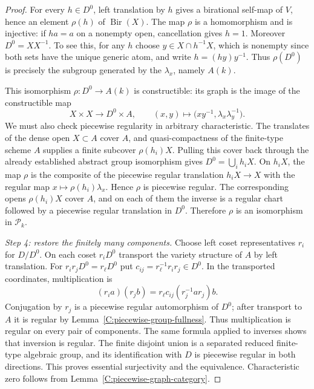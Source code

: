 \begin{proof}
For every $h\in D^0$, left translation by $h$ gives a birational
self-map of $V$, hence an element $\rho(h)$ of
$\operatorname{Bir}(X)$.  The map $\rho$ is a homomorphism and is
injective: if $ha=a$ on a nonempty open, cancellation gives $h=1$.
Moreover $D^0=X X^{-1}$.  To see this, for any $h$ choose
$y\in X\cap h^{-1}X$, which is nonempty since both sets have the unique
generic atom, and write $h=(hy)y^{-1}$.  Thus $\rho(D^0)$ is precisely
the subgroup generated by the $\lambda_x$, namely $A(k)$.

This isomorphism $\rho:D^0\to A(k)$ is constructible: its graph is the
image of the constructible map
\[
 X\times X\longrightarrow D^0\times A,
 \qquad (x,y)\longmapsto
 \bigl(xy^{-1},\lambda_x\lambda_y^{-1}\bigr).
\]
We must also check piecewise regularity in arbitrary characteristic.
The translates of the dense open $X\subset A$ cover $A$, and
quasi-compactness of the finite-type scheme $A$ supplies a finite
subcover $\rho(h_i)X$.  Pulling this cover back through the already
established abstract group isomorphism gives $D^0=\bigcup_i h_iX$.
On $h_iX$, the map $\rho$ is the composite of the
piecewise regular translation $h_iX\to X$ with the regular map
$x\mapsto\rho(h_i)\lambda_x$.  Hence $\rho$ is piecewise regular.
The corresponding opens $\rho(h_i)X$ cover $A$, and on each of them the
inverse is a regular chart followed by a piecewise regular translation
in $D^0$.  Therefore $\rho$ is an isomorphism in $\mathcal P_k$.

\emph{Step 4: restore the finitely many components.}
Choose left coset representatives $r_i$ for $D/D^0$.  On each coset
$r_iD^0$ transport the variety structure of $A$ by left translation.
For $r_ir_jD^0=r_\ell D^0$ put
$c_{ij}=r_\ell^{-1}r_ir_j\in D^0$.  In the transported coordinates,
multiplication is
\[
 (r_i a)(r_j b)=r_\ell c_{ij}(r_j^{-1}ar_j)b.
\]
Conjugation by $r_j$ is a piecewise regular automorphism of $D^0$;
after transport to $A$ it is regular by
Lemma~\ref{C:piecewise-group-fullness}.  Thus multiplication is regular
on every pair of components.  The same formula applied to inverses
shows that inversion is regular.  The finite disjoint union is a
separated reduced finite-type algebraic group, and its identification
with $D$ is piecewise regular in both directions.  This proves essential
surjectivity and the equivalence.  Characteristic zero follows from
Lemma~\ref{C:piecewise-graph-category}.
\end{proof}

